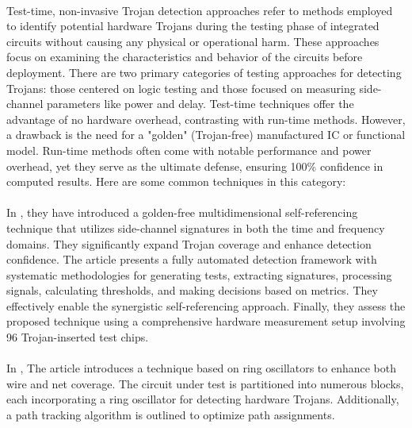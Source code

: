 \paragraph*{}
Test-time, non-invasive Trojan detection approaches refer to methods employed to identify potential hardware Trojans during the testing phase of integrated circuits without causing any physical or operational harm. These approaches focus on examining the characteristics and behavior of the circuits before deployment. There are two primary categories of testing approaches for detecting Trojans: those centered on logic testing and those focused on measuring side-channel parameters like power and delay. Test-time techniques offer the advantage of no hardware overhead, contrasting with run-time methods. However, a drawback is the need for a "golden" (Trojan-free) manufactured IC or functional model. Run-time methods often come with notable performance and power overhead, yet they serve as the ultimate defense, ensuring 100\% confidence in computed results. Here are some common techniques in this category:
\paragraph*{}
In \cite{9684502}, they have introduced a golden-free multidimensional self-referencing technique that utilizes side-channel signatures in both the time and frequency domains. They significantly expand Trojan coverage and enhance detection confidence. The article presents a fully automated detection framework with systematic methodologies for generating tests, extracting signatures, processing signals, calculating thresholds, and making decisions based on metrics. They effectively enable the synergistic self-referencing approach. Finally, they assess the proposed technique using a comprehensive hardware measurement setup involving 96 Trojan-inserted test chips.
\paragraph*{}
In \cite{s13638022021659}, The article introduces a technique based on ring oscillators to enhance both wire and net coverage. The circuit under test is partitioned into numerous blocks, each incorporating a ring oscillator for detecting hardware Trojans. Additionally, a path tracking algorithm is outlined to optimize path assignments.
